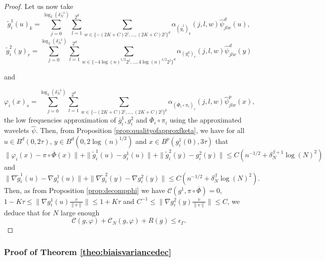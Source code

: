 \documentclass[10pt]{article}
\begin{document}
\begin{proof}
Let us now take
    $$\tilde{g}_i^1(u)_k=\sum \limits_{j=0}^{\log_2(\delta^{-1}_N)} \sum \limits_{l=1}^{2^d} \sum \limits_{w\in \{-(2K+C)2^j,...,(2K+C)2^j\}^d} \alpha_{(\overline{g}_i^1)_k}(j,l,w)\hat{\psi}^d_{jlw}(u),$$
        $$\tilde{g}_i^2(y)_r=\sum \limits_{j=0}^{\log_2(\delta^{-1}_N)} \sum \limits_{l=1}^{2^d} \sum \limits_{w\in \{-4\log(n)^{1/2}2^j,...,4\log(n)^{1/2}2^j\}^d} \alpha_{(g_i^2)_r}(j,l,w)\hat{\psi}^d_{jlw}(y)$$

and
    
\begin{equation*}
\varphi_i(x)_s=\sum \limits_{j=0}^{\log_2(\delta^{-1}_N)} \sum \limits_{l=1}^{2^d} \sum \limits_{w\in \{-(2K+C)2^j,...,(2K+C)2^j\}^p} \alpha_{(\overline{\Phi}_i\circ\pi_i)_s}(j,l,w)\hat{\psi}^p_{jlw}(x),
\end{equation*}
the low frequencies approximation of $\bar{g}_i^1,g_i^2$ and $\overline{\Phi}_i\circ\pi_i$ using the approximated wavelets $\hat{\psi}$.
Then, from Proposition \ref{prop:qualityofapproxfketa}, we have for all $u\in B^d(0,2\tau)$, $y\in B^d(0,2\log(n)^{1/2})$ and $x\in B^p(g_i^1(0),3\tau)$ that
$$\|\varphi_i(x)-\pi\circ\overline{\Phi}(x)\| + \|\tilde{g}_i^1(u)-g_i^1(u)\|+ \|\tilde{g}_i^2(y)-g_i^2(y)\|\leq C\left(n^{-1/2}+\delta_N^{\beta+1}\log(N)^2\right)$$
and
$$\|\nabla \tilde{g}_i^1(u)-\nabla g_i^1(u)\|+\|\nabla \tilde{g}_i^2(y)-\nabla g_i^2(y)\|\leq C\left(n^{-1/2}+\delta_N^{\beta}\log(N)^2\right).$$
Then, as from Proposition \ref{prop:decompphi} we have $\mathcal{C}(g^1,\pi\circ\overline{\Phi})=0$,  $1-K\tau\leq \|\nabla g_i^1(u)\frac{v}{\|v\|}\|\leq 1+K\tau$ and $C^{-1}\leq \|\nabla g_i^2(y)\frac{v}{\|v\|}\|\leq C$, we deduce that for $N$ large enough 
 $$\mathcal{C}(g,\varphi) + \mathcal{C}_N(g,\varphi) +R(g)\leq \epsilon_\Gamma.$$
    
\end{proof}



\subsubsection{Proof of Theorem \ref{theo:biaisvariancedec}}\label{sec:theo:biaisvariancedec}
\end{document}
